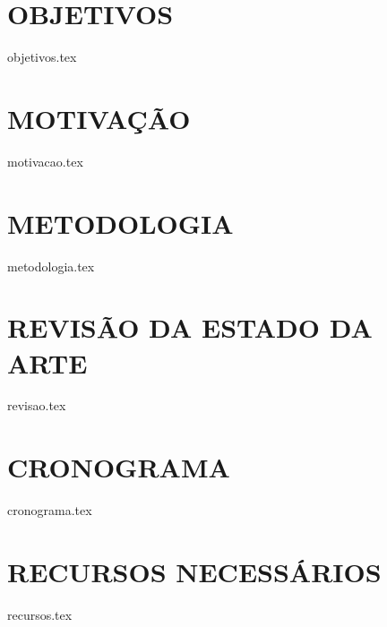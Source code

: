 \documentclass[12pt,a4paper]{article}
\begin{document}
\newpage
\renewcommand{\cftsecleader}{\cftdotfill{\cftdotsep}}
\tableofcontents
{}
\pagebreak

\setcounter{page}{1}
\section{OBJETIVOS}
{objetivos.tex}
\pagebreak

\section{MOTIVAÇÃO}
{motivacao.tex}
\pagebreak

\section{METODOLOGIA}
{metodologia.tex}
\pagebreak

\section{REVISÃO DA ESTADO DA ARTE}
{revisao.tex}
\pagebreak

\section{CRONOGRAMA}
{cronograma.tex}
\pagebreak

\section{RECURSOS NECESSÁRIOS}
{recursos.tex}
\pagebreak

\nocite{*}


\end{document}
